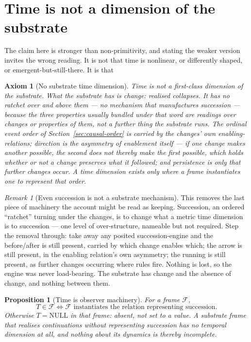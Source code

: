 \documentclass[11pt,a4paper]{article}
\newtheorem{axiom}{Axiom}
\newtheorem{proposition}[definition]{Proposition}
\theoremstyle{remark}\newtheorem{remark}[definition]{Remark}
\begin{document}
\section{Time is not a dimension of the substrate}\label{sec:time-not-primitive}

The claim here is stronger than non-primitivity, and stating the weaker version invites the wrong reading. It is not that time is nonlinear, or differently shaped, or emergent-but-still-there. It is that

\begin{axiom}[No substrate time dimension]\label{ax:no-time}
\emph{Time is not a first-class dimension of the substrate.} What the substrate has is \emph{change}: realised collapses. It has no ratchet over and above them --- no mechanism that manufactures succession --- because the three properties usually bundled under that word are readings over changes or properties of them, not a further thing the substrate runs. The ordinal event order of Section~\ref{sec:causal-order} is carried by the changes' own enabling-relations; direction is the asymmetry of enablement itself --- if one change makes another possible, the second
does not thereby make the first possible, which holds whether or not a change preserves what it
followed; and persistence is only that further changes occur. A time dimension exists only where a frame instantiates one \emph{to represent} that order.
\end{axiom}

\begin{remark}[Even succession is not a substrate mechanism]\label{rem:no-ratchet}
This removes the last piece of machinery the account might be read as keeping. Succession, an ordered ``ratchet'' turning under the changes, is to change what a metric time dimension is to succession --- one level of over-structure, nameable but not required. Step the removal through: take away any posited succession-engine and the before/after is still present, carried by which change enables which; the arrow is still present, in the enabling relation's own asymmetry; the running is still present, as further changes occurring where rules fire. Nothing is lost, so the engine was never load-bearing. The substrate has change and the absence of change, and nothing between them.
\end{remark}

\begin{proposition}[Time is observer machinery]\label{prop:time-observer}
For a frame $\mathcal F$,
\[
\boxed{T\in\mathcal F \iff \mathcal F \text{ instantiates the relation representing succession.}}
\]
Otherwise $T=\mathrm{NULL}$ in that frame: absent, not set to a value. A substrate frame that realises continuations without representing succession has no temporal dimension at all, and nothing about its dynamics is thereby incomplete.
\end{proposition}
\end{document}
